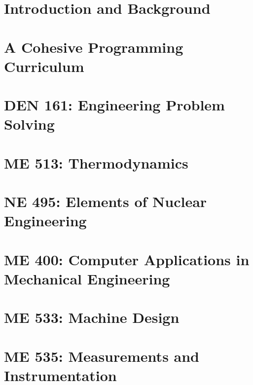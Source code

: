 \documentclass[12pt]{report}
\begin{document}
    

    
    
    

    \tableofcontents

    \listoffigures

    \listoftables
    
    \chapter{Introduction and Background}
    

    \chapter{A Cohesive Programming Curriculum}
    
    
    \chapter{DEN 161: Engineering Problem Solving}
    
    
    \chapter{ME 513: Thermodynamics}
    

    \chapter{NE 495: Elements of Nuclear Engineering}
    
    
    \chapter{ME 400: Computer Applications in Mechanical Engineering}
    
    
    \chapter{ME 533: Machine Design}
    

    \chapter{ME 535: Measurements and Instrumentation}
    
\end{document}
